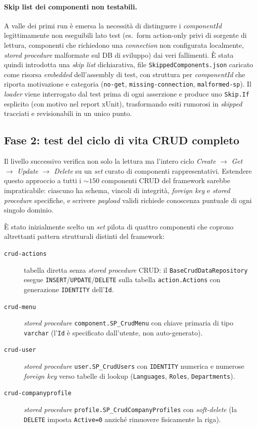 \paragraph{Skip list dei componenti non testabili.} A valle dei primi run è emersa la necessità di distinguere i \emph{componentId} legittimamente non eseguibili lato test (es.\ form action-only privi di sorgente di lettura, componenti che richiedono una \emph{connection} non configurata localmente, \emph{stored procedure} malformate sul DB di sviluppo) dai veri fallimenti. È stata quindi introdotta una \emph{skip list} dichiarativa, file \texttt{SkippedComponents.json} caricato come risorsa \emph{embedded} dell'assembly di test, con struttura per \emph{componentId} che riporta motivazione e categoria (\texttt{no-get}, \texttt{missing-connection}, \texttt{malformed-sp}). Il \emph{loader} viene interrogato dal test prima di ogni asserzione e produce uno \texttt{Skip.If} esplicito (con motivo nel report xUnit), trasformando esiti rumorosi in \emph{skipped} tracciati e revisionabili in un unico punto.

\subsection{Fase 2: test del ciclo di vita CRUD completo}

Il livello successivo verifica non solo la lettura ma l'intero ciclo \emph{Create $\rightarrow$ Get $\rightarrow$ Update $\rightarrow$ Delete} su un \emph{set} curato di componenti rappresentativi. Estendere questo approccio a tutti i ${\sim}\!150$ componenti CRUD del framework sarebbe impraticabile: ciascuno ha schema, vincoli di integrità, \emph{foreign key} e \emph{stored procedure} specifiche, e scrivere \emph{payload} validi richiede conoscenza puntuale di ogni singolo dominio.

È stato inizialmente scelto un \emph{set} pilota di quattro componenti che coprono altrettanti pattern strutturali distinti del framework:
\begin{description}
    \item[\texttt{crud-actions}] tabella diretta senza \emph{stored procedure} CRUD: il \texttt{BaseCrudDataRepository} esegue \texttt{INSERT}/\texttt{UPDATE}/\texttt{DELETE} sulla tabella \texttt{action.Actions} con generazione \texttt{IDENTITY} dell'\texttt{Id}.
    \item[\texttt{crud-menu}] \emph{stored procedure} \texttt{component.SP\_CrudMenu} con chiave primaria di tipo \texttt{varchar} (l'\texttt{Id} è specificato dall'utente, non auto-generato).
    \item[\texttt{crud-user}] \emph{stored procedure} \texttt{user.SP\_CrudUsers} con \texttt{IDENTITY} numerica e numerose \emph{foreign key} verso tabelle di lookup (\texttt{Languages}, \texttt{Roles}, \texttt{Departments}).
    \item[\texttt{crud-companyprofile}] \emph{stored procedure} \texttt{profile.SP\_CrudCompanyProfiles} con \emph{soft-delete} (la \texttt{DELETE} imposta \texttt{Active=0} anziché rimuovere fisicamente la riga).
\end{description}

